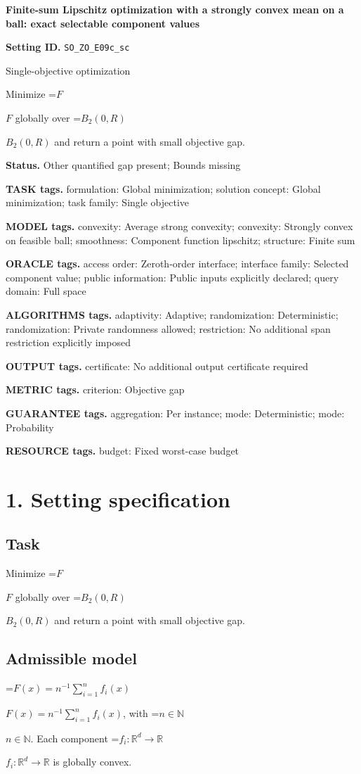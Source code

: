 \documentclass[10pt,a4paper]{article}
\newcommand{\AtlasMath}[1]{\par\begingroup\centering\setbox0=\hbox{$\displaystyle #1$}\ifdim\wd0>1.4\linewidth\typeout{ATLAS WIDE FORMULA: \the\wd0}\fi\ifdim\wd0>\linewidth\resizebox{\linewidth}{!}{\box0}\else\box0\fi\par\endgroup}
\newcommand{\AtlasInlineMath}[1]{\begingroup\setbox0=\hbox{$#1$}\ifdim\wd0>.4\linewidth\endgroup\AtlasMath{#1}\else\endgroup$#1$\fi}
\begin{document}
\raggedright

{\LARGE\bfseries\sffamily\color{AtlasNavy} Finite-sum Lipschitz optimization with a strongly convex mean on a ball: exact selectable component values\par}\vspace{5pt}
\textbf{Setting ID.} \texttt{SO\_\allowbreak{}ZO\_\allowbreak{}E09c\_\allowbreak{}sc}

Single-objective optimization

Minimize \AtlasInlineMath{F} globally over \AtlasInlineMath{B_2(0,R)} and return a point with small objective gap.

\textbf{Status.} Other quantified gap present; Bounds missing

\textbf{TASK tags.} formulation: Global minimization; solution concept: Global minimization; task family: Single objective

\textbf{MODEL tags.} convexity: Average strong convexity; convexity: Strongly convex on feasible ball; smoothness: Component function lipschitz; structure: Finite sum

\textbf{ORACLE tags.} access order: Zeroth-order interface; interface family: Selected component value; public information: Public inputs explicitly declared; query domain: Full space

\textbf{ALGORITHMS tags.} adaptivity: Adaptive; randomization: Deterministic; randomization: Private randomness allowed; restriction: No additional span restriction explicitly imposed

\textbf{OUTPUT tags.} certificate: No additional output certificate required

\textbf{METRIC tags.} criterion: Objective gap

\textbf{GUARANTEE tags.} aggregation: Per instance; mode: Deterministic; mode: Probability

\textbf{RESOURCE tags.} budget: Fixed worst-case budget

\section{1. Setting specification}
\subsection{Task}
Minimize \AtlasInlineMath{F} globally over \AtlasInlineMath{B_2(0,R)} and return a point with small objective gap.

\subsection{Admissible model}
\AtlasInlineMath{F(x)=n^{-1}\sum_{i=1}^n f_i(x)}, with \AtlasInlineMath{n\in\mathbb{N}}. Each component \AtlasInlineMath{f_i:\mathbb{R}^d\to\mathbb{R}} is globally convex.
\end{document}
